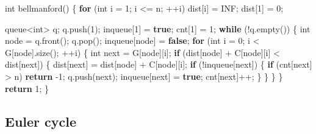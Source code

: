 \documentclass[10pt,]{article}
\newenvironment{Shaded}{}{}
\newcommand{\KeywordTok}[1]{\textcolor[rgb]{0.00,0.44,0.13}{\textbf{{#1}}}}
\newcommand{\DataTypeTok}[1]{\textcolor[rgb]{0.56,0.13,0.00}{{#1}}}
\newcommand{\DecValTok}[1]{\textcolor[rgb]{0.25,0.63,0.44}{{#1}}}
\newcommand{\NormalTok}[1]{{#1}}
\begin{document}
\begin{Shaded}
\begin{Highlighting}[]
\DataTypeTok{int} \NormalTok{bellmanford() \{}
  \KeywordTok{for} \NormalTok{(}\DataTypeTok{int} \NormalTok{i = }\DecValTok{1}\NormalTok{; i <= n; ++i)}
      \NormalTok{dist[i] = INF;}
  \NormalTok{dist[}\DecValTok{1}\NormalTok{] = }\DecValTok{0}\NormalTok{;}

  \NormalTok{queue<}\DataTypeTok{int}\NormalTok{> q;}
  \NormalTok{q.push(}\DecValTok{1}\NormalTok{);}
  \NormalTok{inqueue[}\DecValTok{1}\NormalTok{] = }\KeywordTok{true}\NormalTok{;}
  \NormalTok{cnt[}\DecValTok{1}\NormalTok{] = }\DecValTok{1}\NormalTok{;}
  \KeywordTok{while} \NormalTok{(!q.empty()) \{}
    \DataTypeTok{int} \NormalTok{node = q.front();}
    \NormalTok{q.pop();}
    \NormalTok{inqueue[node] = }\KeywordTok{false}\NormalTok{;}
    \KeywordTok{for} \NormalTok{(}\DataTypeTok{int} \NormalTok{i = }\DecValTok{0}\NormalTok{; i < G[node].size(); ++i) \{}
      \DataTypeTok{int} \NormalTok{next = G[node][i];}
      \KeywordTok{if} \NormalTok{(dist[node] + C[node][i] < dist[next]) \{}
        \NormalTok{dist[next] = dist[node] + C[node][i];}
        \KeywordTok{if} \NormalTok{(!inqueue[next]) \{}
          \KeywordTok{if} \NormalTok{(cnt[next] > n)}
            \KeywordTok{return} \NormalTok{-}\DecValTok{1}\NormalTok{;}
          \NormalTok{q.push(next);}
          \NormalTok{inqueue[next] = }\KeywordTok{true}\NormalTok{;}
          \NormalTok{cnt[next]++;}
        \NormalTok{\}}
      \NormalTok{\}}
    \NormalTok{\}}
  \NormalTok{\}}
  \KeywordTok{return} \DecValTok{1}\NormalTok{;}
\NormalTok{\}}
\end{Highlighting}
\end{Shaded}

\subsection{Euler cycle}
\end{document}
